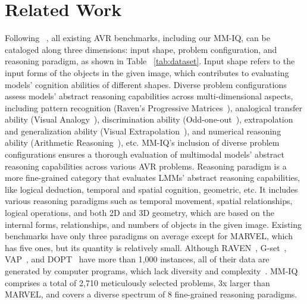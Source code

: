 \section{Related Work}
\label{sec:Categories}
Following ~\cite{malkinski2023review,jiang2024marvel, malkinski2022deep}, all existing AVR benchmarks, including our MM-IQ, can be cataloged along three dimensions: input shape, problem configuration, and reasoning paradigm, as shown in Table ~\ref{tab:dataset}.
Input shape refers to the input forms of the objects in the given image, which contributes to evaluating models' cognition abilities of different shapes. Diverse problem configurations assess models' abstract reasoning capabilities across multi-dimensional aspects, including pattern recognition (Raven’s Progressive Matrices~\cite{raven2003raven}), analogical transfer ability (Visual Analogy~\cite{hill2019learning}), discrimination ability (Odd-one-out~\cite{mandziuk2019deepiq}), extrapolation and generalization ability (Visual Extrapolation~\cite{webb2020learning}), and numerical reasoning ability (Arithmetic Reasoning~\cite{zhang2020machine}), etc. MM-IQ's inclusion of diverse problem configurations ensures a thorough evaluation of multimodal models' abstract reasoning capabilities across various AVR problems. Reasoning paradigm is a more fine-grained category that evaluates LMMs' abstract reasoning capabilities, like logical deduction, temporal and spatial cognition, geometric, etc. It includes various reasoning paradigms such as temporal movement, spatial relationships, logical operations, and both 2D and 3D geometry, which are based on the internal forms, relationships, and numbers of objects in the given image. Existing benchmarks have only three paradigms on average except for MARVEL, which has five ones, but its quantity is relatively small. Although RAVEN~\citep{zhang2019raven},  G-set~\citep{mandziuk2019deepiq}, VAP~\citep{hill2019learning}, and DOPT~\citep{webb2020learning} have more than 1,000 instances, all of their data are generated by computer programs, which lack diversity and complexity~\cite{chollet2019measure}. MM-IQ comprises a total of 2,710 meticulously selected problems, 3x larger than MARVEL, and covers a diverse spectrum of 8 fine-grained reasoning paradigms.

